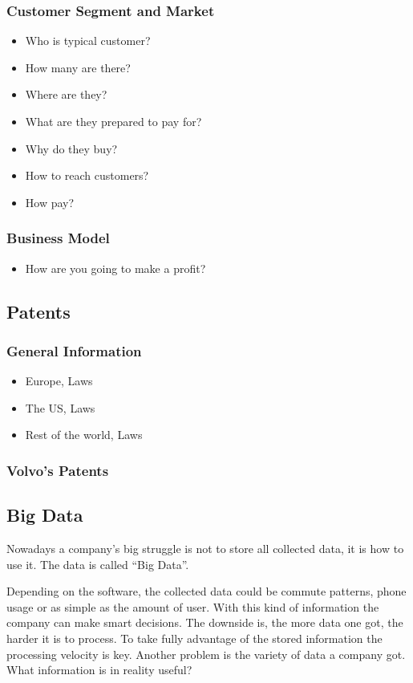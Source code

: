 \documentclass[conference]{IEEEtran}
\begin{document}
\subsubsection{Customer Segment and Market}
\begin{itemize}
	\item Who is typical customer?
	\item How many are there?
	\item Where are they?
	\item  What are they prepared to pay for?
	\item Why do they buy?
	\item How to reach customers?
	\item How pay?
\end{itemize}
\subsubsection{Business Model}
\begin{itemize}
	\item How are you going to make a profit?
\end{itemize}
\subsection{Patents}
\subsubsection{General Information}
\begin{itemize}
	\item Europe, Laws
	\item The US, Laws
	\item Rest of the world, Laws
\end{itemize}
\subsubsection{Volvo's Patents}
\subsection{Big Data}
Nowadays a company's big struggle is not to store all collected data, it is how to use it. The data is called ``Big Data''. 

Depending on the software, the collected data could be commute patterns, phone usage or as simple as the amount of user. With this kind of information the company can make smart decisions. The downside is, the more data one got, the harder it is to process. To take fully advantage of the stored information the processing velocity is key. Another problem is the variety of data a company got. What information is in reality useful? %
\end{document}
